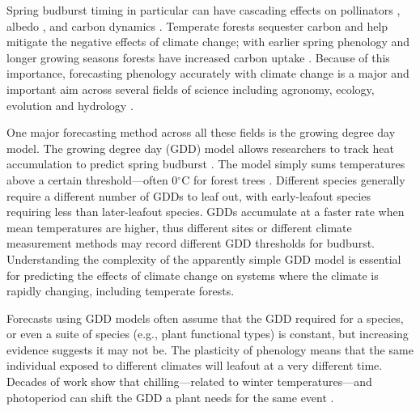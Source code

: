 \documentclass{article}\usepackage[]{graphicx}\usepackage[]{color}
\begin{document}
Spring budburst timing in particular can have cascading effects on pollinators \citep{Boggs2012, Pardee2017}, albedo \citep{Williamson2016}, and carbon dynamics \citep{Richardson2013}. Temperate forests sequester carbon and help mitigate the negative effects of climate change; with earlier spring phenology and longer growing seasons forests have increased carbon uptake \citep{Keenan2014}. Because of this importance, forecasting phenology accurately with climate change is a major and important aim across several fields of science including agronomy, ecology, evolution and hydrology \citep{Moorcroft2001,Bolton2013,Yu2016,Taylor2020}. 
  
One major forecasting method across all these fields is the growing degree day model. The growing degree day (GDD) model allows researchers to track heat accumulation to predict spring budburst \citep{Schwartz2006,Vitasse2011,Cook2012,Phillimore2013,Crimmins2020}. The model simply sums temperatures above a certain threshold---often 0$^{\circ}$C for forest trees  \citep[as estimates are proven to be more accurate,][]{Man2010}. Different species generally require a different number of GDDs to leaf out, with early-leafout species requiring less than later-leafout species. GDDs accumulate at a faster rate when mean temperatures are higher, thus different sites or different climate measurement methods may record different GDD thresholds for budburst. Understanding the complexity of the apparently simple GDD model \citep{Bonhomme2000} is essential for predicting the effects of climate change on systems where the climate is rapidly changing, including temperate forests. 

Forecasts using GDD models often assume that the GDD required for a species, or even a suite of species (e.g., plant functional types) is constant, but increasing evidence suggests it may not be. The plasticity of phenology means that the same individual exposed to different climates will leafout at a very different time. Decades of work show that chilling---related to winter temperatures---and photoperiod can shift the GDD a plant needs for the same event \citep{Basler2012,Chuine2010,Zohner2016}. 
\end{document}
